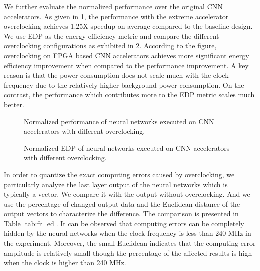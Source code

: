 We further evaluate the normalized performance over the original CNN accelerators.
As given in \ref{fig:relative_time_overclock}, the performance with the extreme accelerator 
overclocking achieves 1.25X speedup on average compared to the baseline design. 
We use EDP as the energy efficiency metric and compare the 
different overclocking configurations as exhibited in \ref{fig:relative_energy_overclock}.
According to the figure, overclocking on FPGA based CNN 
accelerators achieves more significant energy efficiency improvement when 
compared to the performance improvement. A key reason is that 
the power consumption does not scale much with the clock frequency due to the 
relatively higher background power consumption. On the contrast, 
the performance which contributes more to the EDP metric scales 
much better. 

\begin{figure}
    \caption{Normalized performance of neural networks executed on CNN accelerators with different overclocking.}
\label{fig:relative_time_overclock}
\vspace{-1em}
\end{figure}

\begin{figure}
    \caption{Normalized EDP of neural networks executed on CNN accelerators with different overclocking.}
\label{fig:relative_energy_overclock}
\vspace{-1em}
\end{figure}

In order to quantize the exact computing errors caused by overclocking, we 
particularly analyze the last layer output of the neural networks which 
is typically a vector. We compare it with the output without overclocking.
And we use the percentage of changed output data and the Euclidean distance 
of the output vectors to characterize the difference. 
The comparison is presented in Table \ref{tab:fr_ed}. It can be observed that 
computing errors can be completely hidden by the neural networks when the clock 
frequency is less than 240 MHz in the experiment. Moreover, the small Euclidean indicates that 
the computing error amplitude is relatively small though the percentage of 
the affected results is high when the clock is higher than 240 MHz.

